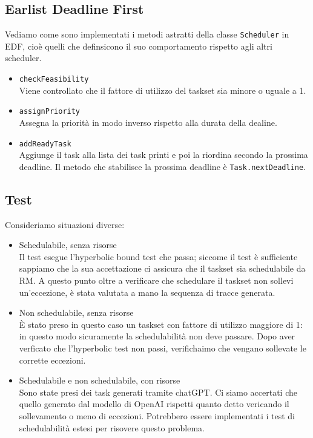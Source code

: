 \subsection{Earlist Deadline First}
Vediamo come sono implementati i metodi astratti della classe \texttt{Scheduler} in EDF, cioè quelli che definsicono il suo comportamento rispetto agli altri scheduler.
\begin{itemize}
    \item \texttt{checkFeasibility} \\
        Viene controllato che il fattore di utilizzo del taskset sia minore o uguale a 1.
    \item \texttt{assignPriority} \\
        Assegna la priorità in modo inverso rispetto alla durata della dealine.
    \item \texttt{addReadyTask} \\
        Aggiunge il task alla lista dei task printi e poi la riordina secondo la prossima deadline. Il metodo che stabilisce la prossima deadline è \texttt{Task.nextDeadline}.
\end{itemize}

\subsection{Test}
Consideriamo situazioni diverse:
\begin{itemize}
    \item Schedulabile, senza risorse \\
        Il test esegue l'hyperbolic bound test che passa; siccome il test è sufficiente sappiamo che la sua accettazione ci assicura che il taskset sia schedulabile da RM. A questo punto oltre a verificare che schedulare il taskset non sollevi un'eccezione, è stata valutata a mano la sequenza di tracce generata.
    \item Non schedulabile, senza risorse \\
        È stato preso in questo caso un taskset con fattore di utilizzo maggiore di 1: in questo modo sicuramente la schedulabilità non deve passare. Dopo aver verficato che l'hyperbolic test non passi, verifichaimo che vengano sollevate le corrette eccezioni.
    \item Schedulabile e non schedulabile, con risorse \\
        Sono state presi dei task generati tramite chatGPT. Ci siamo accertati che quello generato dal modello di OpenAI rispetti quanto detto vericando il sollevamento o meno di eccezioni. Potrebbero essere implementati i test di schedulabilità estesi per risovere questo problema.
\end{itemize}


